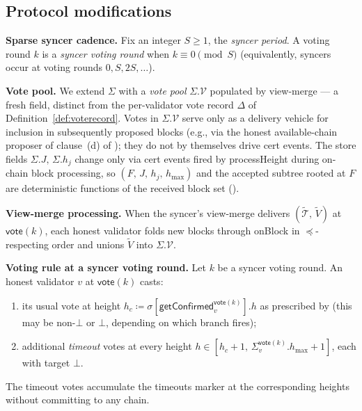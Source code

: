 \ifx\litemode\undefined\documentclass{article}\fi
\newcommand{\T}[0]{\ensuremath{\mathcal{T}}}
\newcommand{\hmax}{\ensuremath{h_{\max}}\xspace}
\newcommand{\processHeight}{\textsf{processHeight}\xspace}
\newcommand{\vote}{\ensuremath{\mathsf{vote}}}
\newcommand{\comm}[1]{\ensuremath{\widetilde{#1}}}
\newcommand{\onBlock}{\textsf{onBlock}\xspace}
\newcommand{\getConfirmed}{\textsf{getConfirmed}\xspace}
\renewcommand{\paragraph}[1]{\vspace{7pt}\noindent\textbf{#1}}
\theoremstyle{plain}
\theoremstyle{definition}
\theoremstyle{remark}
\begin{document}
\subsection{Protocol modifications}\label{sec:protocol-mods}

\paragraph{Sparse syncer cadence.}
Fix an integer $S \geq 1$, the \emph{syncer period}. A voting round $k$ is a \emph{syncer voting round} when $k \equiv 0 \pmod{S}$ (equivalently, syncers occur at voting rounds $0, S, 2S, \dots$).

\paragraph{Vote pool.}
We extend $\Sigma$ with a \emph{vote pool} $\Sigma.\mathcal{V}$ populated by view-merge --- a fresh field, distinct from the per-validator vote record $\Delta$ of Definition~\ref{def:voterecord}. Votes in $\Sigma.\mathcal{V}$ serve only as a delivery vehicle for inclusion in subsequently proposed blocks (e.g., via the honest available-chain proposer of clause~(d) of ); they do not by themselves drive cert events. The store fields $\Sigma.J,\, \Sigma.h_j$ change only via cert events fired by \processHeight{} during on-chain block processing, so $(F,\, J,\, h_j,\, \hmax)$ and the accepted subtree rooted at $F$ are deterministic functions of the received block set ().

\paragraph{View-merge processing.}
When the syncer's view-merge delivers $(\comm{\T},\, \comm{V})$ at~$\vote(k)$, each honest validator folds new blocks through \onBlock{} in $\preceq$-respecting order and unions $\comm{V}$ into $\Sigma.\mathcal{V}$.

\paragraph{Voting rule at a syncer voting round.}
Let $k$ be a syncer voting round. An honest validator $v$ at $\vote(k)$ casts:
\begin{enumerate}
  \item its usual vote at height $h_c \coloneqq \sigma[\getConfirmed_v^{\vote(k)}].h$ as prescribed by  (this may be non-$\bot$ or $\bot$, depending on which branch fires);
  \item additional \emph{timeout} votes at every height $h \in [h_c+1,\, \Sigma_v^{\vote(k)}.\hmax + 1]$, each with target $\bot$.
\end{enumerate}
The timeout votes accumulate the timeouts marker at the corresponding heights without committing to any chain.
\end{document}
